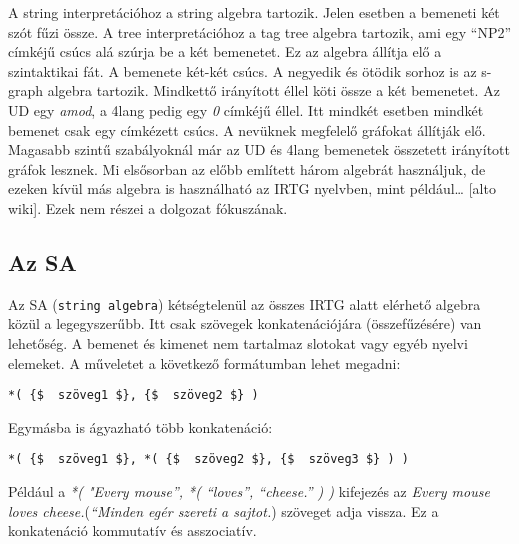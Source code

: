 A string interpretációhoz a string algebra tartozik. Jelen esetben a bemeneti két szót fűzi össze. A tree interpretációhoz a tag tree algebra tartozik, ami egy “NP2” címkéjű csúcs alá szúrja be a két bemenetet. Ez az algebra állítja elő a szintaktikai fát. A bemenete két-két csúcs.  A negyedik és ötödik sorhoz is az s-graph algebra tartozik. Mindkettő irányított éllel köti össze a két bemenetet. Az UD egy \textit{amod}, a 4lang pedig egy \textit{0} címkéjű éllel. Itt mindkét esetben mindkét bemenet csak egy címkézett csúcs. A nevüknek megfelelő gráfokat állítják elő. Magasabb szintű szabályoknál már az UD és 4lang bemenetek összetett irányított gráfok lesznek. Mi elsősorban az előbb említett három algebrát használjuk, de ezeken kívül más algebra is használható az IRTG nyelvben, mint például… [alto wiki]. Ezek nem részei a dolgozat fókuszának.



\subsection{Az SA}
Az SA (\texttt{string algebra}) kétségtelenül az összes IRTG alatt elérhető algebra közül a legegyszerűbb. Itt csak szövegek konkatenációjára (összefűzésére) van lehetőség. A bemenet és kimenet nem tartalmaz slotokat vagy egyéb nyelvi elemeket. A műveletet a következő formátumban lehet megadni:
\begin{verbatim}
*( {$  szöveg1 $}, {$  szöveg2 $} )
\end{verbatim}

Egymásba is ágyazható több konkatenáció:
\begin{verbatim}
*( {$  szöveg1 $}, *( {$  szöveg2 $}, {$  szöveg3 $} ) )
\end{verbatim}

Például a \textit{*( "Every mouse”, *( “loves”, “cheese.” ) )} kifejezés az \textit{Every mouse loves cheese.}(\textit{“Minden egér szereti a sajtot.}) szöveget adja vissza. Ez a konkatenáció kommutatív és asszociatív.




